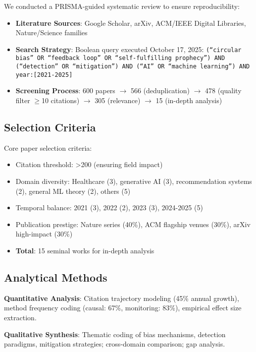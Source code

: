 \documentclass[11pt]{article}
\begin{document}
We conducted a PRISMA-guided systematic review to ensure reproducibility:
\begin{itemize}
    \item \textbf{Literature Sources}: Google Scholar, arXiv, ACM/IEEE Digital Libraries, Nature/Science families
    \item \textbf{Search Strategy}: Boolean query executed October 17, 2025: \texttt{(``circular bias'' OR ``feedback loop'' OR ``self-fulfilling prophecy'') AND (``detection'' OR ``mitigation'') AND (``AI'' OR ``machine learning'') AND year:[2021-2025]}
    \item \textbf{Screening Process}: 600 papers $\rightarrow$ 566 (deduplication) $\rightarrow$ 478 (quality filter $\geq$10 citations) $\rightarrow$ 305 (relevance) $\rightarrow$ 15 (in-depth analysis)
\end{itemize}

\subsection{Selection Criteria}

Core paper selection criteria:
\begin{itemize}
    \item Citation threshold: >200 (ensuring field impact)
    \item Domain diversity: Healthcare (3), generative AI (3), recommendation systems (2), general ML theory (2), others (5)
    \item Temporal balance: 2021 (3), 2022 (2), 2023 (3), 2024-2025 (5)
    \item Publication prestige: Nature series (40\%), ACM flagship venues (30\%), arXiv high-impact (30\%)
    \item \textbf{Total}: 15 seminal works for in-depth analysis
\end{itemize}

\subsection{Analytical Methods}

\textbf{Quantitative Analysis}: Citation trajectory modeling (45\% annual growth), method frequency coding (causal: 67\%, monitoring: 83\%), empirical effect size extraction.

\textbf{Qualitative Synthesis}: Thematic coding of bias mechanisms, detection paradigms, mitigation strategies; cross-domain comparison; gap analysis.
\end{document}
